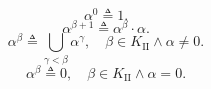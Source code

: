 $$\alpha^0 \triangleq 1.$$
$$\alpha^{\beta+1} \triangleq \alpha^\beta \cdot \alpha.$$
$$\alpha^\beta \triangleq \bigcup_{\gamma < \beta} \alpha^\gamma, \quad \beta \in K_{\mathrm{II}} \land \alpha \neq 0.$$
$$\alpha^\beta \triangleq 0, \quad \beta \in K_{\mathrm{II}} \land \alpha = 0.$$
